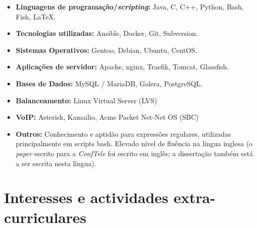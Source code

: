 \documentclass[11pt,a4paper,sans]{moderncv} %
\begin{document}
\begin{itemize}

\item \textbf{Linguagens de programação/\textit{scripting}:} Java, C, C++, Python, Bash, Fish, LaTeX. \\

\vspace{6pt}

\item \textbf{Tecnologias utilizadas:} Ansible, Docker, Git, Subversion.
  
\vspace{6pt}

\item \textbf{Sistemas Operativos:} Gentoo, Debian, Ubuntu, CentOS.

\vspace{6pt}

\item \textbf{Aplicações de servidor:} Apache, nginx, Traefik, Tomcat,
  Glassfish.

\vspace{6pt}

\item \textbf{Bases de Dados:} MySQL / MariaDB, Galera, PostgreSQL.

\vspace{6pt}

\item \textbf{Balanceamento:} Linux Virtual Server (LVS)

\vspace{6pt}

\item \textbf{VoIP:} Asterisk, Kamailio, Acme Packet Net-Net OS (SBC)

\vspace{6pt}

\item \textbf{Outros: } Conhecimento e aptidão para expressões regulares,
  utilizadas principalmente em scripts bash. Elevado nível de fluência na língua
  inglesa (o \textit{paper} escrito para a \textit{ConfTele} foi escrito em
  inglês; a dissertação também está a ser escrita nesta língua).

\end{itemize}

\section{Interesses e actividades extra-curriculares}
\end{document}
